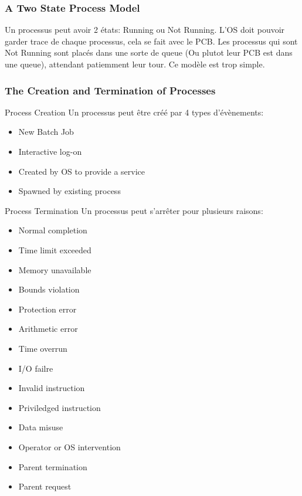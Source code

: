 \subsubsection{A Two State Process Model}
Un processus peut avoir 2 états: Running ou Not Running.
L'OS doit pouvoir garder trace de chaque processus, cela se fait avec le PCB.
Les processus qui sont Not Running sont placés dans une sorte de queue (Ou plutot leur PCB est dans une queue), attendant patiemment leur tour.
Ce modèle est trop simple.

\subsubsection{The Creation and Termination of Processes}
Process Creation
Un processus peut être créé par 4 types d'évènements:
\begin{itemize}
  \item New Batch Job
  \item Interactive log-on
  \item Created by OS to provide a service
  \item Spawned by existing process
\end{itemize}
Process Termination
Un processus peut s'arrêter pour plusieurs raisons:
\begin{itemize}
  \item Normal completion
  \item Time limit exceeded
  \item Memory unavailable
  \item Bounds violation
  \item Protection error
  \item Arithmetic error
  \item Time overrun
  \item I/O failre
  \item Invalid instruction
  \item Priviledged instruction
  \item Data misuse
  \item Operator or OS intervention
  \item Parent termination
  \item Parent request
\end{itemize}

